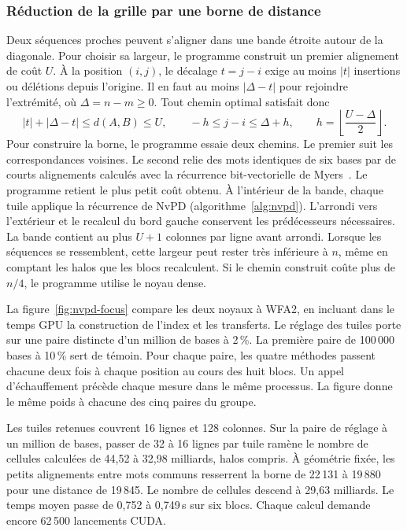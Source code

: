 \subsubsection{Réduction de la grille par une borne de distance}\label{sec:bande-cuda}
Deux séquences proches peuvent s’aligner dans une bande étroite autour de la diagonale. Pour choisir sa largeur, le programme construit un premier alignement de coût \(U\). À la position \((i,j)\), le décalage \(t=j-i\) exige au moins \(|t|\) insertions ou délétions depuis l’origine. Il en faut au moins \(|\Delta-t|\) pour rejoindre l’extrémité, où \(\Delta=n-m\geq0\). Tout chemin optimal satisfait donc
\[
 |t|+|\Delta-t|\leq d(A,B)\leq U,
 \qquad -h\leq j-i\leq\Delta+h,\qquad h=\left\lfloor\frac{U-\Delta}{2}\right\rfloor .
\]
Pour construire la borne, le programme essaie deux chemins. Le premier suit les correspondances voisines. Le second relie des mots identiques de six bases par de courts alignements calculés avec la récurrence bit-vectorielle de Myers~\cite{myers}. Le programme retient le plus petit coût obtenu. À l’intérieur de la bande, chaque tuile applique la récurrence de NvPD (algorithme~\ref{alg:nvpd}). L’arrondi vers l’extérieur et le recalcul du bord gauche conservent les prédécesseurs nécessaires. La bande contient au plus \(U+1\) colonnes par ligne avant arrondi. Lorsque les séquences se ressemblent, cette largeur peut rester très inférieure à \(n\), même en comptant les halos que les blocs recalculent. Si le chemin construit coûte plus de \(n/4\), le programme utilise le noyau dense.

La figure~\ref{fig:nvpd-focus} compare les deux noyaux à WFA2, en incluant dans le temps GPU la construction de l’index et les transferts. Le réglage des tuiles porte sur une paire distincte d’un million de bases à 2\,\%. La première paire de 100\,000 bases à 10\,\% sert de témoin. Pour chaque paire, les quatre méthodes passent chacune deux fois à chaque position au cours des huit blocs. Un appel d’échauffement précède chaque mesure dans le même processus. La figure donne le même poids à chacune des cinq paires du groupe.

Les tuiles retenues couvrent 16 lignes et 128 colonnes. Sur la paire de réglage à un million de bases, passer de 32 à 16 lignes par tuile ramène le nombre de cellules calculées de 44,52 à 32,98 milliards, halos compris. À géométrie fixée, les petits alignements entre mots communs resserrent la borne de 22\,131 à 19\,880 pour une distance de 19\,845. Le nombre de cellules descend à 29,63 milliards. Le temps moyen passe de 0,752 à 0,749\,s sur six blocs. Chaque calcul demande encore 62\,500 lancements CUDA.

